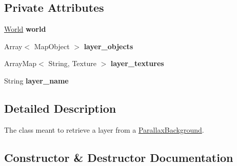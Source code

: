 \subsection*{Private Attributes}
\begin{DoxyCompactItemize}
\item 
\mbox{\label{classnl_1_1arjanfrans_1_1mario_1_1view_1_1ParallaxLayer_ab8a033d010684f7e59398046887ca726}} 
\hyperlink{classnl_1_1arjanfrans_1_1mario_1_1model_1_1World}{World} {\bfseries world}
\item 
\mbox{\label{classnl_1_1arjanfrans_1_1mario_1_1view_1_1ParallaxLayer_a8199fd99969e10e6339ac95896c44e77}} 
Array$<$ Map\+Object $>$ {\bfseries layer\+\_\+objects}
\item 
\mbox{\label{classnl_1_1arjanfrans_1_1mario_1_1view_1_1ParallaxLayer_a738382929b532aa9d8aeb39b70b3e3a6}} 
Array\+Map$<$ String, Texture $>$ {\bfseries layer\+\_\+textures}
\item 
\mbox{\label{classnl_1_1arjanfrans_1_1mario_1_1view_1_1ParallaxLayer_acb8fb1a4b8028154adc4622df84bf552}} 
String {\bfseries layer\+\_\+name}
\end{DoxyCompactItemize}


\subsection{Detailed Description}
The class meant to retrieve a layer from a \hyperlink{classnl_1_1arjanfrans_1_1mario_1_1view_1_1ParallaxBackground}{Parallax\+Background}. 

\subsection{Constructor \& Destructor Documentation}
\mbox{\label{classnl_1_1arjanfrans_1_1mario_1_1view_1_1ParallaxLayer_aec238fa2067afb4e286f8db8b616aeac}} 
